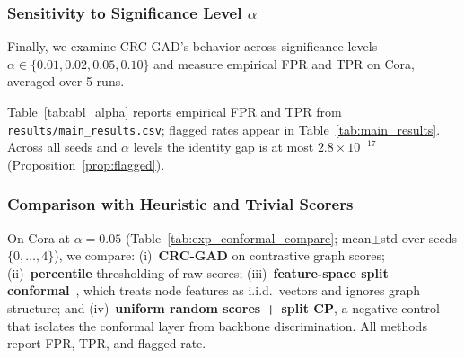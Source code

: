 \documentclass[a4paper]{cas-dc}
\theoremstyle{definition}
\begin{document}
\subsubsection{Sensitivity to Significance Level \texorpdfstring{$\alpha$}{alpha}}
\label{sec:abl_alpha}

Finally, we examine CRC-GAD's behavior across significance levels $\alpha \in \{0.01,0.02,0.05,0.10\}$ and measure empirical FPR and TPR on Cora, averaged over 5 runs.
\begin{table}[pos=t]
\centering
\caption{FPR/TPR vs.\ $\alpha$ on Cora (mean $\pm$ std over 5 seeds; auto-generated).}
\label{tab:abl_alpha}
\footnotesize

\end{table}

Table~\ref{tab:abl_alpha} reports empirical FPR and TPR from \texttt{results/main\_results.csv}; flagged rates appear in Table~\ref{tab:main_results}. Across all seeds and $\alpha$ levels the identity gap is at most $2.8\times 10^{-17}$ (Proposition~\ref{prop:flagged}).

\subsubsection{Comparison with Heuristic and Trivial Scorers}
\label{sec:exp_conformal_compare}

On Cora at $\alpha=0.05$ (Table~\ref{tab:exp_conformal_compare}; mean$\pm$std over seeds $\{0,\ldots,4\}$), we compare: (i)~\textbf{CRC-GAD} on contrastive graph scores; (ii)~\textbf{percentile} thresholding of raw scores; (iii)~\textbf{feature-space split conformal}~\cite{bates2023testing}, which treats node features as i.i.d.\ vectors and ignores graph structure; and (iv)~\textbf{uniform random scores + split CP}, a negative control that isolates the conformal layer from backbone discrimination. All methods report FPR, TPR, and flagged rate.

\begin{table}[pos=t]
\centering
\caption{Heuristic comparison on Cora ($\alpha=0.05$; mean$\pm$std over 5 seeds). Feat.\ CP is feature-space split conformal; Unif.+CP is uniform random scores plus split CP. Full multi-dataset view in Table~\ref{tab:heuristics_multi}.}
\label{tab:exp_conformal_compare}
\footnotesize
\setlength{\tabcolsep}{2.5pt}

\end{table}

\begin{table}[pos=t]
\centering
\caption{Heuristic comparison across Planetoid graphs ($\alpha=0.05$; mean$\pm$std, 5 seeds).}
\label{tab:heuristics_multi}
\footnotesize

\end{table}
\end{document}
